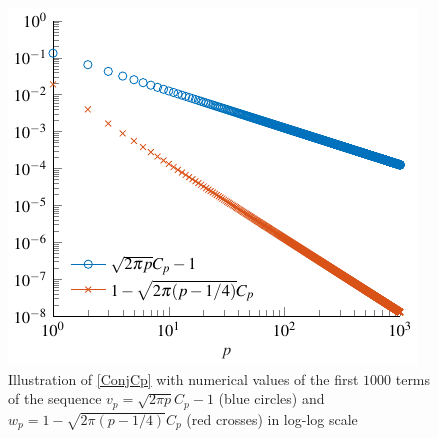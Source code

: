 \documentclass{article}
\begin{document}
\begin{figure}[H]
	\centering
	\includegraphics[scale = 1]{EncadrementCp}
	\caption{Illustration of \autoref{ConjCp} with numerical values of the first $1000$ terms of the sequence ${v_p = \sqrt{2\pi p}C_p - 1}$ (blue circles) and ${w_p = 1 - \sqrt{2\pi(p-1/4)}C_p}$ (red crosses) in log-log scale}
	\label{figure:encadrementCp}
\end{figure}
\end{document}
